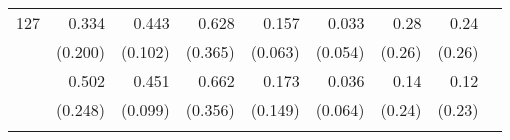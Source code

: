 \begin{longtable}{rrrrrrrrr}
127&0.334&0.443&0.628&0.157&0.033&0.28&0.24\\&(0.200)&(0.102)&(0.365)&(0.063)&(0.054)&(0.26)&(0.26) \\ \addlinespace[0.05cm] 128&0.502&0.451&0.662&0.173&0.036&0.14&0.12\\&(0.248)&(0.099)&(0.356)&(0.149)&(0.064)&(0.24)&(0.23) \\ \addlinespace[0.05cm]  \hline\hline\end{longtable}